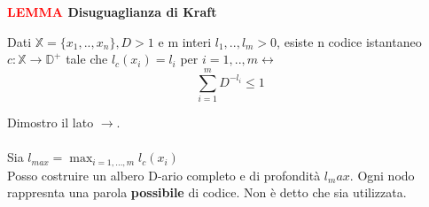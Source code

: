 \documentclass{article}
\begin{document}
    \vspace{5px}
    \begin{tcolorbox}
        \textbf{\textcolor{red}{LEMMA} Disuguaglianza di Kraft}
        \begin{center}
            Dati $ \mathbb{X} = \{x_1,..,x_n\}, D > 1$ e m interi $l_1,..,l_m > 0$, esiste n codice istantaneo $c: \mathbb{X} \rightarrow \mathbb{D}^+$ tale che $l_c(x_i) = l_i$ per $i = 1,..,m \leftrightarrow $ $$\sum_{i = 1}^m D^{-l_i} \leq 1$$
        \end{center}
    \end{tcolorbox}

    \vspace{5px}

    \noindent Dimostro il lato $\rightarrow$. \\  \\
    Sia $l_{max} = \max_{i=1,...,m} l_c(x_i)$ \\
    Posso costruire un albero D-ario completo e di profondità $l_max$. Ogni nodo rappresnta una parola \textbf{possibile} di codice. Non è detto che sia utilizzata.
\end{document}

